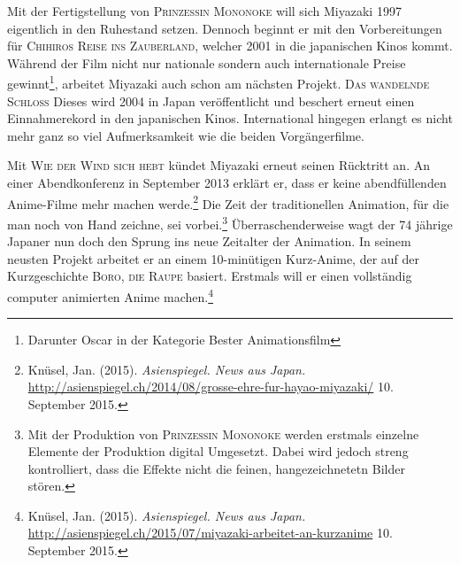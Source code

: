 Mit der Fertigstellung von \textsc{Prinzessin Mononoke} will sich Miyazaki 1997 eigentlich in den Ruhestand setzen. Dennoch beginnt er mit den Vorbereitungen für \textsc{Chihiros Reise ins Zauberland}, welcher 2001 in die japanischen Kinos kommt. Während der Film nicht nur nationale sondern auch internationale Preise gewinnt\footnote{Darunter Oscar in der Kategorie Bester Animationsfilm}, arbeitet Miyazaki auch schon am nächsten Projekt. \textsc{Das wandelnde Schloss} Dieses wird 2004 in Japan veröffentlicht und beschert erneut einen Einnahmerekord in den japanischen Kinos. International hingegen erlangt es nicht mehr ganz so viel Aufmerksamkeit wie die beiden Vorgängerfilme. 

Mit \textsc{Wie der Wind sich hebt} kündet Miyazaki erneut seinen Rücktritt an. An einer Abendkonferenz in September 2013 erklärt er, dass er keine abendfüllenden Anime-Filme mehr machen werde.\footnote{Knüsel, Jan. (2015). \emph{Asienspiegel. News aus Japan.}\\ \url{http://asienspiegel.ch/2014/08/grosse-ehre-fur-hayao-miyazaki/} 10. September 2015.} Die Zeit der traditionellen Animation, für die man noch von Hand zeichne, sei vorbei.\footnote{Mit der Produktion von \textsc{Prinzessin Mononoke} werden erstmals einzelne Elemente der Produktion digital Umgesetzt. Dabei wird jedoch streng kontrolliert, dass die Effekte nicht die feinen, hangezeichnetetn Bilder stören.} Überraschenderweise wagt der 74 jährige Japaner nun doch den Sprung ins neue Zeitalter der Animation. In seinem neusten Projekt arbeitet er an einem 10-minütigen Kurz-Anime, der auf der Kurzgeschichte \textsc{Boro, die Raupe} basiert. Erstmals will er einen vollständig computer animierten Anime machen.\footnote{Knüsel, Jan. (2015). \emph{Asienspiegel. News aus Japan.}\\ \url{http://asienspiegel.ch/2015/07/miyazaki-arbeitet-an-kurzanime} 10. September 2015.}